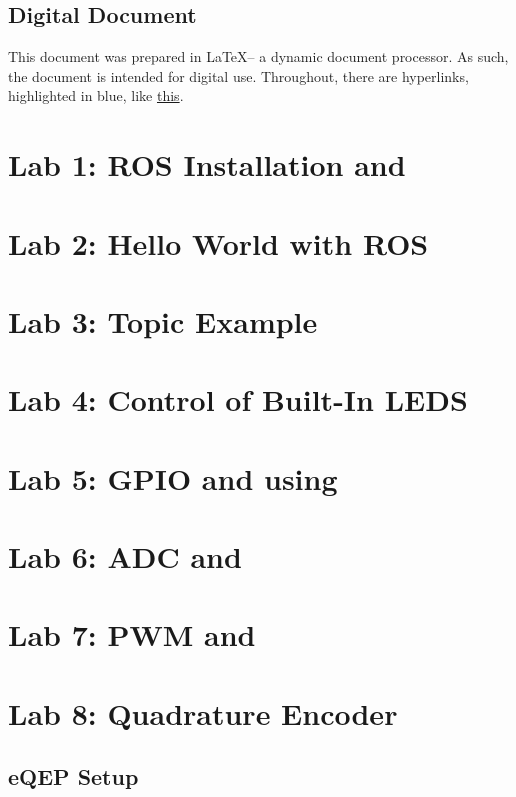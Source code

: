 \documentclass{article}
\let\Oldsection\section
\renewcommand{\section}{\FloatBarrier\Oldsection}
\let\Oldsubsection\subsection
\renewcommand{\subsection}{\FloatBarrier\Oldsubsection}
\def\CC{{C\nolinebreak[4]\hspace{-.05em}\raisebox{.4ex}{\tiny\bf ++}}}
\begin{document}
\subsection*{Digital Document}
This document was prepared in \LaTeX -- a dynamic document processor. As such, the document is intended for digital use. Throughout, there are hyperlinks, highlighted in blue, like \href{https://en.wikipedia.org/wiki/Robot}{this}.
\clearpage
\section{Lab 1: ROS Installation and \protect\CC}
\clearpage
\section{Lab 2: Hello World with ROS}
\clearpage
\section{Lab 3: Topic Example}
\clearpage
\section{Lab 4: Control of Built-In LEDS}


\clearpage
\section{Lab 5: GPIO and using \protect\CC}


\clearpage
\section{Lab 6: ADC and \protect\CC}


\clearpage
\section{Lab 7: PWM and \protect\CC}


\clearpage
\section{Lab 8: Quadrature Encoder}
	\subsection{ eQEP Setup}
\end{document}
